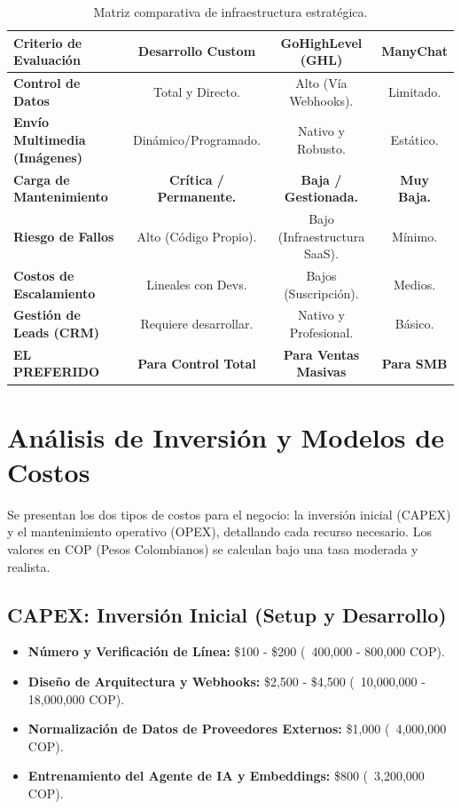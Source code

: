 \documentclass[12pt,a4paper]{article}
\begin{document}
\begin{table}[h]
\centering
\scriptsize
\begin{tabular}{|l|c|c|c|}
\hline
\rowcolor{primaryblue!10} \textbf{Criterio de Evaluación} & \textbf{Desarrollo Custom} & \textbf{GoHighLevel (GHL)} & \textbf{ManyChat} \\ \hline
\textbf{Control de Datos} & Total y Directo. & Alto (Vía Webhooks). & Limitado. \\ \hline
\textbf{Envío Multimedia (Imágenes)} & Dinámico/Programado. & Nativo y Robusto. & Estático. \\ \hline
\textbf{Carga de Mantenimiento} & \textbf{Crítica / Permanente.} & \textbf{Baja / Gestionada.} & \textbf{Muy Baja.} \\ \hline
\textbf{Riesgo de Fallos} & Alto (Código Propio). & Bajo (Infraestructura SaaS). & Mínimo. \\ \hline
\textbf{Costos de Escalamiento} & Lineales con Devs. & Bajos (Suscripción). & Medios. \\ \hline
\textbf{Gestión de Leads (CRM)} & Requiere desarrollar. & Nativo y Profesional. & Básico. \\ \hline
\rowcolor{lightgray}\textbf{EL PREFERIDO} & \textbf{Para Control Total} & \textbf{Para Ventas Masivas} & \textbf{Para SMB} \\ \hline
\end{tabular}
\caption{Matriz comparativa de infraestructura estrat\'egica.}
\end{table}

\newpage

\section{Análisis de Inversión y Modelos de Costos}
Se presentan los dos tipos de costos para el negocio: la inversión inicial (CAPEX) y el mantenimiento operativo (OPEX), detallando cada recurso necesario. Los valores en COP (Pesos Colombianos) se calculan bajo una tasa moderada y realista.

\subsection{CAPEX: Inversión Inicial (Setup y Desarrollo)}
\begin{itemize}
    \item \textbf{Número y Verificación de Línea:} \$100 - \$200 (~400,000 - 800,000 COP).
    \item \textbf{Dise\~no de Arquitectura y Webhooks:} \$2,500 - \$4,500 (~10,000,000 - 18,000,000 COP).
    \item \textbf{Normalización de Datos de Proveedores Externos:} \$1,000 (~4,000,000 COP).
    \item \textbf{Entrenamiento del Agente de IA y Embeddings:} \$800 (~3,200,000 COP).
\end{itemize}
\end{document}
